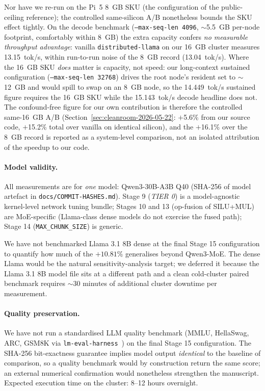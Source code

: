 \documentclass[10pt,a4paper]{article}
\begin{document}
Nor have we re-run on the Pi~5 8~GB SKU (the configuration of the public-ceiling reference); the controlled same-silicon A/B nonetheless bounds the SKU effect tightly. On the decode benchmark (\texttt{--max-seq-len 4096}, $\sim$5.5~GB per-node footprint, comfortably within 8~GB) the extra capacity confers \emph{no measurable throughput advantage}: vanilla \texttt{distributed-llama} on our 16~GB cluster measures 13.15~tok/s, within run-to-run noise of the 8~GB record (13.04~tok/s). Where the 16~GB SKU \emph{does} matter is capacity, not speed: our long-context sustained configuration (\texttt{--max-seq-len 32768}) drives the root node's resident set to $\sim$12~GB and would spill to swap on an 8~GB node, so the 14.449~tok/s sustained figure requires the 16~GB SKU while the 15.143~tok/s decode headline does not. The confound-free figure for our own contribution is therefore the controlled same-16~GB A/B (Section~\ref{sec:cleanroom-2026-05-22}: $+$5.6\% from our source code, $+$15.2\% total over vanilla on identical silicon), and the $+$16.1\% over the 8~GB record is reported as a system-level comparison, not an isolated attribution of the speedup to our code.

\paragraph{Model validity.}
All measurements are for \emph{one} model: Qwen3-30B-A3B Q40 (SHA-256 of model artefact in \texttt{docs/COMMIT-HASHES.md}). Stage 9 (\emph{TIER 0}) is a model-agnostic kernel-level network tuning bundle; Stages 10 and 13 (op-fusion of SILU+MUL) are MoE-specific (Llama-class dense models do not exercise the fused path); Stage 14 (\texttt{MAX\_CHUNK\_SIZE}) is generic.

We have not benchmarked Llama 3.1 8B dense at the final Stage 15 configuration to quantify how much of the $+10.81\%$ generalises beyond Qwen3-MoE. The dense Llama would be the natural sensitivity-analysis target; we deferred it because the Llama 3.1 8B model file sits at a different path and a clean cold-cluster paired benchmark requires $\sim$30 minutes of additional cluster downtime per measurement.

\paragraph{Quality preservation.}
We have not run a standardised LLM quality benchmark (MMLU, HellaSwag, ARC, GSM8K via \texttt{lm-eval-harness}~\cite{lmevalharness2024}) on the final Stage 15 configuration. The SHA-256 bit-exactness guarantee implies model output \emph{identical} to the baseline of comparison, so a quality benchmark would by construction return the same score; an external numerical confirmation would nonetheless strengthen the manuscript. Expected execution time on the cluster: 8--12 hours overnight.
\end{document}
